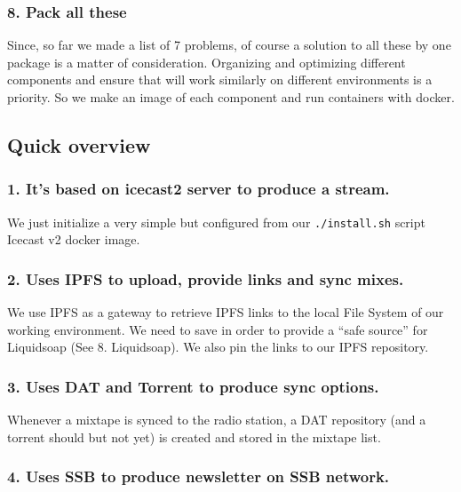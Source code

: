\documentclass[12pt]{report}
\begin{document}
\subsubsection{8. Pack all these}\label{pack-all-these}

Since, so far we made a list of 7 problems, of course a solution to all
these by one package is a matter of consideration. Organizing and
optimizing different components and ensure that will work similarly on
different environments is a priority. So we make an image of each
component and run containers with docker.


\subsection{Quick overview}\label{quick-overview}


\subsubsection{1. It's based on icecast2 server to produce a
stream.}\label{its-based-on-icecast2-server-to-produce-a-stream.}

We just initialize a very simple but configured from our
\texttt{./install.sh} script Icecast v2 docker image.


\subsubsection{2. Uses IPFS to upload, provide links and sync
mixes.}\label{uses-ipfs-to-upload-provide-links-and-sync-mixes.}

We use IPFS as a gateway to retrieve IPFS links to the local File System
of our working environment. We need to save in order to provide a ``safe
source'' for Liquidsoap (See 8. Liquidsoap). We also pin the links to
our IPFS repository.


\subsubsection{3. Uses DAT and Torrent to produce sync
options.}\label{uses-dat-and-torrent-to-produce-sync-options.}

Whenever a mixtape is synced to the radio station, a DAT repository (and
a torrent should but not yet) is created and stored in the mixtape list.


\subsubsection{4. Uses SSB to produce newsletter on SSB
network.}\label{uses-ssb-to-produce-newsletter-on-ssb-network.}
\end{document}

